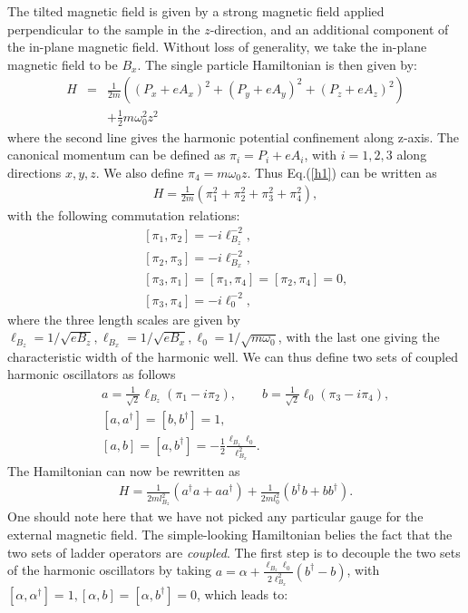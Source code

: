 \documentclass[twocolumn,showpacs,amsmath,amstex,amssymb,mathfonts,prb]{revtex4-1}
\begin{document}
The tilted magnetic field is given by a strong magnetic field applied perpendicular to the sample in the $z$-direction, and an additional component of the in-plane magnetic field. Without loss of generality, we take the in-plane magnetic field to be $B_x$. The single particle Hamiltonian is then given by:
\begin{eqnarray}\label{h1}
H&=&\frac{1}{2m}\left(\left(P_x+eA_x\right)^2+\left(P_y+eA_y\right)^2+\left(P_z+eA_z\right)^2\right)\nonumber\\
&&+\frac{1}{2}m\omega_0^2z^2
\end{eqnarray}
where the second line gives the harmonic potential confinement along z-axis. The canonical momentum can be defined as $\pi_i=P_i+eA_i$, with $i=1,2,3$ along directions $x,y,z$. We also define $\pi_4=m\omega_0z$. Thus Eq.(\ref{h1}) can be written as
\begin{eqnarray}\label{h2}
H=\frac{1}{2m}\left(\pi_1^2+\pi_2^2+\pi_3^2+\pi_4^2\right),
\end{eqnarray}
with the following commutation relations:
\begin{eqnarray}\label{commutation}
&&[\pi_1,\pi_2]=-i\ell_{B_z}^{-2},\nonumber\\
&&[\pi_2,\pi_3]=-i\ell_{B_x}^{-2},\nonumber\\
&&[\pi_3,\pi_1]=[\pi_1,\pi_4]=[\pi_2,\pi_4]=0,\nonumber\\
&&[\pi_3,\pi_4]=-i\ell_0^{-2},
\end{eqnarray}
where the three length scales are given by $\ell_{B_z}=1/\sqrt{eB_z},\ell_{B_x}=1/\sqrt{eB_x},\ell_0=1/\sqrt{m\omega_0}$, with the last one giving the characteristic width of the harmonic well. We can thus define two sets of coupled harmonic oscillators as follows
\begin{eqnarray}\label{ho1}
&&a=\frac{1}{\sqrt{2}}\ell_{B_z}\left(\pi_1-i\pi_2\right),\qquad b=\frac{1}{\sqrt{2}}\ell_0\left(\pi_3-i\pi_4\right),\nonumber\\
&&[a,a^\dagger]=[b,b^\dagger]=1,\nonumber\\
&&[a,b]=[a,b^\dagger]=-\frac{1}{2}\frac{\ell_{B_z}\ell_0}{\ell_{B_x}^{2}}.
\end{eqnarray}
The Hamiltonian can now be rewritten as 
\begin{eqnarray}\label{h3}
H=\frac{1}{2ml_{B_z}^2}\left(a^\dagger a+aa^\dagger\right)+\frac{1}{2ml_0^2}\left(b^\dagger b+bb^\dagger\right).
\end{eqnarray}
One should note here that we have not picked any particular gauge for the external magnetic field. The simple-looking Hamiltonian belies the fact that the two sets of ladder operators are \emph{coupled}. The first step is to decouple the two sets of the harmonic oscillators by taking $a=\alpha+\frac{\ell_{B_z}\ell_0}{2\ell_{B_x}^2}\left(b^\dagger-b\right)$, with $[\alpha,\alpha^\dagger]=1,[\alpha,b]=[\alpha,b^\dagger]=0$, which leads to:
\end{document}
